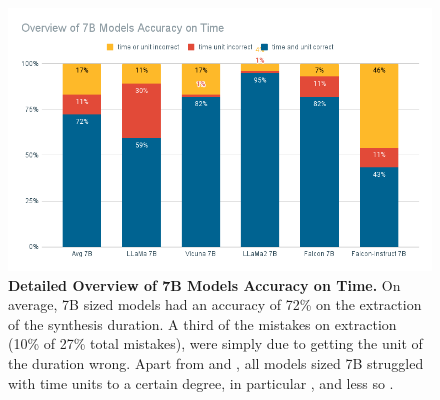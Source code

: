\begin{figure}[!htb]
    \begin{centering}
        \includegraphics[width=\textwidth]{img/overview_7b_time}
        \caption[7B Models Detailed Time Accuracy]{\textbf{Detailed Overview of 7B Models Accuracy on Time.}
            On average, 7B sized models had an accuracy of 72\% on the extraction of the synthesis duration.
            A third of the mistakes on \ttime extraction (10\% of 27\% total mistakes), were simply due to getting the unit of the duration wrong.
            Apart from  and , all models sized 7B struggled with time units to a certain degree, in particular , and less so .
        }
        \label{fig:7b_time}
    \end{centering}
\end{figure}
